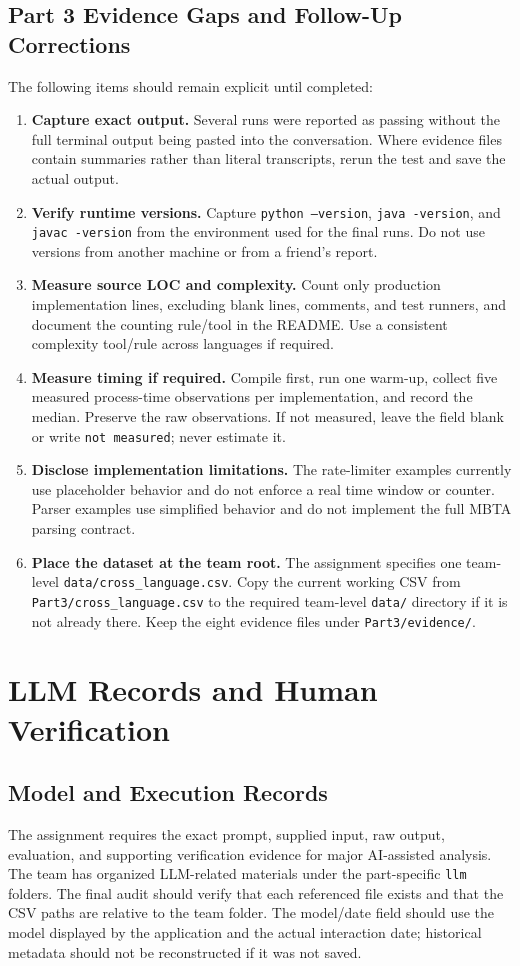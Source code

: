 \documentclass[11pt,a4paper]{article}
\newcommand{\code}[1]{\texttt{#1}}
\begin{document}
\subsection{Part 3 Evidence Gaps and Follow-Up Corrections}
The following items should remain explicit until completed:
\begin{enumerate}[leftmargin=*]
\item \textbf{Capture exact output.} Several runs were reported as passing without the full terminal output being pasted into the conversation. Where evidence files contain summaries rather than literal transcripts, rerun the test and save the actual output.
\item \textbf{Verify runtime versions.} Capture \code{python --version}, \code{java -version}, and \code{javac -version} from the environment used for the final runs. Do not use versions from another machine or from a friend's report.
\item \textbf{Measure source LOC and complexity.} Count only production implementation lines, excluding blank lines, comments, and test runners, and document the counting rule/tool in the README. Use a consistent complexity tool/rule across languages if required.
\item \textbf{Measure timing if required.} Compile first, run one warm-up, collect five measured process-time observations per implementation, and record the median. Preserve the raw observations. If not measured, leave the field blank or write \code{not measured}; never estimate it.
\item \textbf{Disclose implementation limitations.} The rate-limiter examples currently use placeholder behavior and do not enforce a real time window or counter. Parser examples use simplified behavior and do not implement the full MBTA parsing contract.
\item \textbf{Place the dataset at the team root.} The assignment specifies one team-level \code{data/cross\_language.csv}. Copy the current working CSV from \code{Part3/cross\_language.csv} to the required team-level \code{data/} directory if it is not already there. Keep the eight evidence files under \code{Part3/evidence/}.
\end{enumerate}

\section{LLM Records and Human Verification}
\subsection{Model and Execution Records}
The assignment requires the exact prompt, supplied input, raw output, evaluation, and supporting verification evidence for major AI-assisted analysis. The team has organized LLM-related materials under the part-specific \code{llm} folders. The final audit should verify that each referenced file exists and that the CSV paths are relative to the team folder. The model/date field should use the model displayed by the application and the actual interaction date; historical metadata should not be reconstructed if it was not saved.
\end{document}
